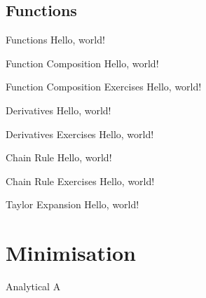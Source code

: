 \subsection{Functions}

  \begin{frame}{Functions}
    Hello, world!
  \end{frame}

  \begin{frame}{Function Composition}
    Hello, world!
  \end{frame}

  \begin{frame}{Function Composition Exercises}
    Hello, world!
  \end{frame}

  \begin{frame}{Derivatives}
    Hello, world!
  \end{frame}

  \begin{frame}{Derivatives Exercises}
    Hello, world!
  \end{frame}

  \begin{frame}{Chain Rule}
    Hello, world!
  \end{frame}

  \begin{frame}{Chain Rule Exercises}
    Hello, world!
  \end{frame}

  \begin{frame}{Taylor Expansion}
    Hello, world!
  \end{frame}

  \section{Minimisation}
  \begin{frame}{Analytical}
    A
  \end{frame}

